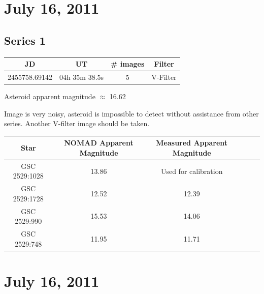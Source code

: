 \documentclass[11pt,a4paper]{article}
\begin{document}



\clearpage
\section{July 16, 2011}
\subsection{Series 1}
\begin{center}
\begin{tabular}{| c |  c | c | c | }
\hline
JD & UT & \# images & Filter \\ \hline
2455758.69142 & 04h 35m 38.5s & 5 & V-Filter \\ \hline
\end{tabular}
\end{center}

\begin{figure}[h!]
  \centering
\end{figure}

Asteroid apparent magnitude $\approx$ 16.62

Image is very noisy, asteroid is impossible to detect without assistance from other series. Another V-filter image should be taken.

\begin{center}
\begin{tabular}{| c |  c | c | c | c |  c | }
\hline
Star & NOMAD Apparent Magnitude & Measured Apparent Magnitude \\ \hline \hline
GSC 2529:1028 & 13.86 & Used for calibration \\ \hline
GSC 2529:1728 & 12.52 & 12.39 \\ \hline
GSC 2529:990 & 15.53 & 14.06 \\ \hline
GSC 2529:748 & 11.95 & 11.71 \\ \hline
\end{tabular}
\end{center}



\clearpage
\section*{July 16, 2011}
\end{document}
